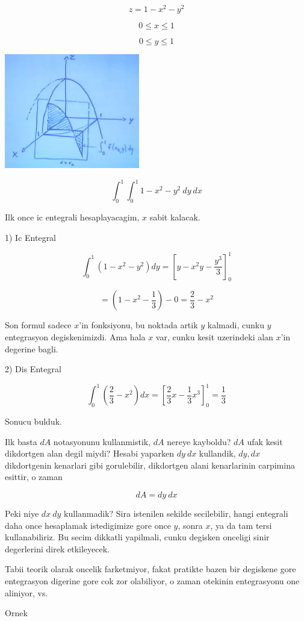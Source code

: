 \documentclass[12pt,fleqn]{article}\usepackage{../common}
\begin{document}
\[ z = 1 - x^2 - y^2 \]

\[ 0 \le x \le 1 \]

\[ 0 \le y \le 1 \]

\includegraphics[height=5cm]{16_8.png}

\[ \int_0^1 \int_0^1  1-x^2-y^2 \ dy \ dx \]

Ilk once ic entegrali hesaplayacagim, $x$ sabit kalacak. 

1) Ic Entegral

\[ \int_0^1 (1-x^2-y^2) dy = [y - x^2y - \frac{y^3}{3}]_0^1 \]

\[ = (1 - x^2 - \frac{1}{3}) - 0 = \frac{2}{3} - x^2\]

Son formul sadece $x$'in fonksiyonu, bu noktada artik $y$ kalmadi, cunku
$y$ entegrasyon degiskenimizdi. Ama hala $x$ var, cunku kesit uzerindeki
alan $x$'in degerine bagli. 

2) Dis Entegral 

\[ \int_0^1 (\frac{2}{3} - x^2)dx = [\frac{2}{3}x - \frac{1}{3}x^3]_0^1 = 
\frac{1}{3}
 \]

Sonucu bulduk. 

Ilk basta $dA$ notasyonunu kullanmistik, $dA$ nereye kayboldu? $dA$ ufak
kesit dikdortgen alan degil miydi? Hesabi yaparken $dy \ dx$ kullandik,
$dy,dx$ dikdortgenin kenarlari gibi gorulebilir, dikdortgen alani
kenarlarinin carpimina esittir, o zaman 

\[ dA = dy \ dx \]

Peki niye $dx \ dy$ kullanmadik? Sira istenilen sekilde secilebilir, hangi
entegrali daha once hesaplamak istedigimize gore once $y$, sonra $x$, ya da
tam tersi kullanabiliriz. Bu secim dikkatli yapilmali, cunku degisken
onceligi sinir degerlerini direk etkileyecek. 

Tabii teorik olarak oncelik farketmiyor, fakat pratikte bazen bir degiskene
gore entegrasyon digerine gore cok zor olabiliyor, o zaman otekinin
entegrasyonu one aliniyor, vs.

Ornek
\end{document}
